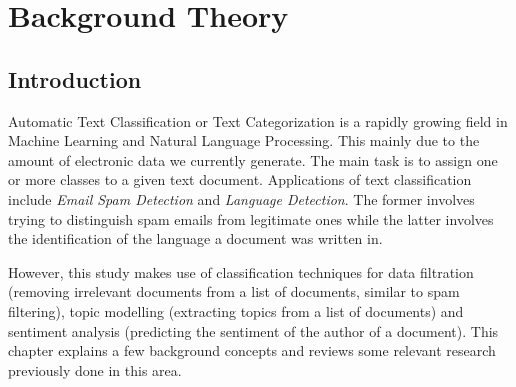 
\chapter{Background Theory}

\label{ch:background}

\section{Introduction}
\label{sec:background_introduction}

Automatic Text Classification or Text Categorization is a rapidly growing field in Machine Learning
and Natural Language Processing. This mainly due to the amount of electronic data we currently
generate. The main task is to assign one or more classes to a given text document. Applications of
text classification include \textit{Email Spam Detection} and \textit{Language
Detection}. The former involves trying to distinguish spam emails from legitimate ones while the
latter involves the identification of the language a document was written in.

However, this study makes use of classification techniques for data filtration (removing irrelevant
documents from a list of documents, similar to spam filtering), topic modelling (extracting topics
from a list of documents) and sentiment analysis (predicting the sentiment of the author of a
document). This chapter explains a few background concepts and reviews some relevant research
previously done in this area.

%

